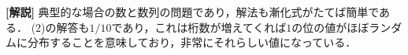 \documentclass[a4paper,10pt]{ltjsarticle}
\begin{document}
\begin{multicols}{2}
{\bf[解説]}
典型的な場合の数と数列の問題であり，解法も漸化式がたてば簡単である．
(2)の解答も$1/10$であり，これは桁数が増えてくれば$1$の位の値がほぼランダムに分布することを意味しており，非常にそれらしい値になっている．

     \newpage
\end{multicols}
\end{document}
